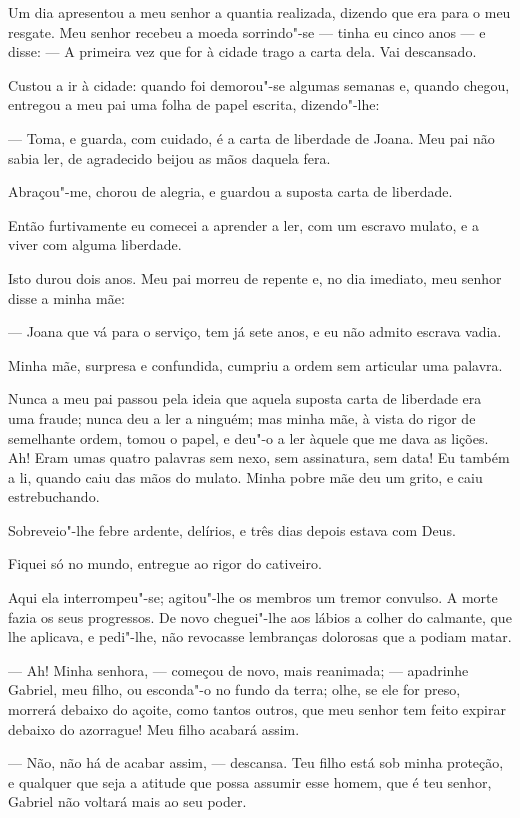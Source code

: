 Um dia apresentou a meu senhor a quantia realizada, dizendo que era para
o meu resgate. Meu senhor recebeu a moeda sorrindo"-se --- tinha eu cinco
anos --- e disse: --- A primeira vez que for à cidade trago a carta dela.
Vai descansado.

Custou a ir à cidade: quando foi demorou"-se algumas semanas e, quando
chegou, entregou a meu pai uma folha de papel escrita, dizendo"-lhe:

--- Toma, e guarda, com cuidado, é a carta de liberdade de Joana. Meu
pai não sabia ler, de agradecido beijou as mãos daquela fera.

Abraçou"-me, chorou de alegria, e guardou a suposta carta de liberdade.

Então furtivamente eu comecei a aprender a ler, com um escravo mulato, e
a viver com alguma liberdade.

Isto durou dois anos. Meu pai morreu de repente e, no dia imediato, meu
senhor disse a minha mãe:

--- Joana que vá para o serviço, tem já sete anos, e eu não admito
escrava vadia.

Minha mãe, surpresa e confundida, cumpriu a ordem sem articular uma
palavra.

Nunca a meu pai passou pela ideia que aquela suposta carta de liberdade
era uma fraude; nunca deu a ler a ninguém; mas minha mãe, à vista do
rigor de semelhante ordem, tomou o papel, e deu"-o a ler àquele que me
dava as lições. Ah! Eram umas quatro palavras sem nexo, sem assinatura,
sem data! Eu também a li, quando caiu das mãos do mulato. Minha pobre
mãe deu um grito, e caiu estrebuchando.

Sobreveio"-lhe febre ardente, delírios, e três dias depois estava com
Deus.

Fiquei só no mundo, entregue ao rigor do cativeiro.

Aqui ela interrompeu"-se; agitou"-lhe os membros um tremor convulso. A
morte fazia os seus progressos. De novo cheguei"-lhe aos lábios a colher
do calmante, que lhe aplicava, e pedi"-lhe, não revocasse lembranças
dolorosas que a podiam matar.

--- Ah! Minha senhora, --- começou de novo, mais reanimada; --- apadrinhe
Gabriel, meu filho, ou esconda"-o no fundo da terra; olhe, se ele for
preso, morrerá debaixo do açoite, como tantos outros, que meu senhor tem
feito expirar debaixo do azorrague! Meu filho acabará assim.

--- Não, não há de acabar assim, --- descansa. Teu filho está sob minha
proteção, e qualquer que seja a atitude que possa assumir esse homem,
que é teu senhor, Gabriel não voltará mais ao seu poder.

